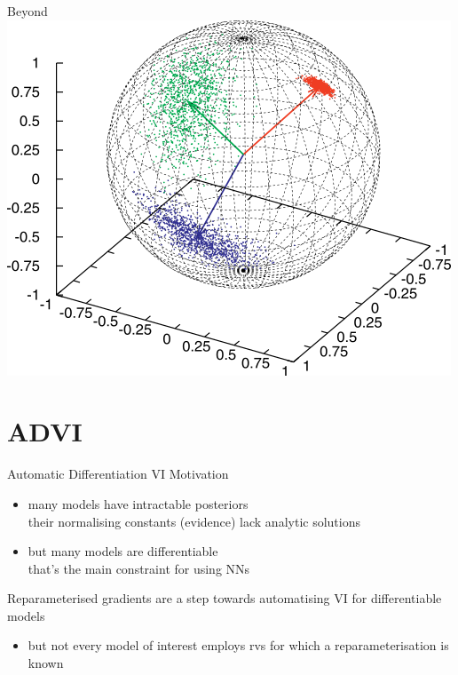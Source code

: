 \begin{frame}{Beyond}
{		\includegraphics[scale=0.3]{densities/spherical}
	}
	

\end{frame}

\section{ADVI}

\begin{frame}{Automatic Differentiation VI}
	Motivation
	\begin{itemize}
		\item many models have intractable posteriors\\
		their normalising constants (evidence) lack analytic solutions \pause
		\item but many models are differentiable\\
		that's the main constraint for using NNs \pause
	\end{itemize}

	Reparameterised gradients are a step towards automatising VI for differentiable models \pause
	\begin{itemize}
		\item but not every model of interest employs rvs for which a reparameterisation is known %
	\end{itemize}
	
\end{frame}


